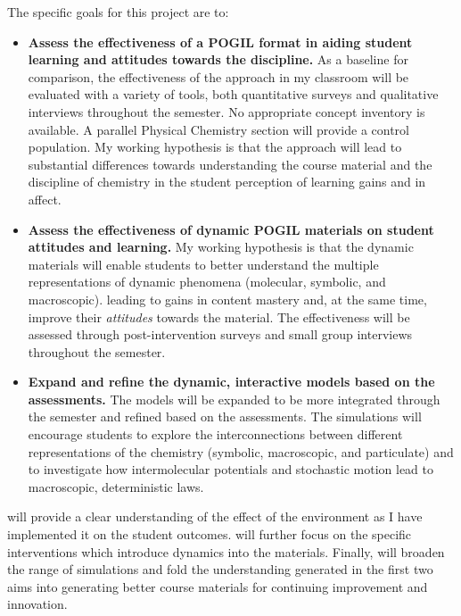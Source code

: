 \documentclass[10pt,letterpaper]{article}
\begin{document}
The specific goals for this project are to:
\begin{itemize}[nosep]
\item \textbf{Assess the effectiveness of a POGIL format in aiding student learning and attitudes towards the discipline.} As a baseline for comparison, the effectiveness of the \pogil approach in my classroom will be evaluated with a variety of tools, both quantitative surveys and qualitative interviews throughout the semester. No appropriate concept inventory is available.  A parallel Physical Chemistry section will provide a control population.  My working hypothesis is that the \pogil approach will lead to substantial differences towards understanding the course material and the discipline of chemistry in the student perception of learning gains and in affect.

\item \textbf{Assess the effectiveness of dynamic POGIL materials on student attitudes and learning.}  
 My working hypothesis is that the dynamic materials will enable students to better understand the multiple representations of dynamic phenomena (molecular, symbolic, and macroscopic). 
leading to gains in content mastery and, at the same time, improve their \textit{attitudes} towards the material.  The effectiveness will be assessed through post-intervention surveys and small group interviews throughout the semester.

\item \textbf{Expand and refine the dynamic, interactive models based on the assessments.} 
The models will be expanded to be more integrated through the semester
and refined based on the assessments. The simulations will encourage students to explore the interconnections between different representations of the chemistry (symbolic, macroscopic, and particulate) and to investigate how intermolecular potentials and stochastic motion lead to macroscopic, deterministic laws. 
\end{itemize}
 will provide a clear understanding of the effect
of the \pogil environment as I have implemented it on the student
outcomes.  will further focus on the specific
interventions which introduce dynamics into the \pogil
materials. Finally,  will broaden the range of
simulations and fold the understanding generated in the first two aims into generating better course materials for continuing improvement and innovation. 
\end{document}
